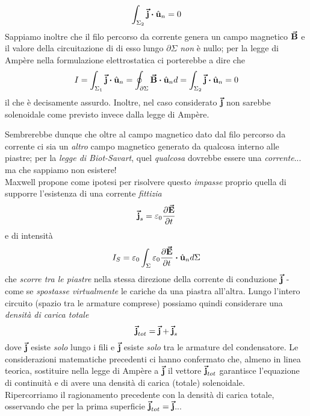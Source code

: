 \begin{equation*}
	\int_{\Sigma_2}\vba{j}\vdot\vbh{u}_n=0
\end{equation*}
Sappiamo inoltre che il filo percorso da corrente genera un campo magnetico $\vb*{\va{B}}$ e il valore della circuitazione di di esso lungo $\partial \Sigma$ \textit{non} è nullo; per la legge di Ampère nella formulazione elettrostatica ci porterebbe a dire che
\begin{equation*}
	I=\int_{\Sigma_1}\vba{j}\vdot\vbh{u}_n=\oint_{\partial \Sigma}\vba{B}\vdot\vbh{u}_nd=\int_{\Sigma_2}\vba{j}\vdot\vbh{u}_n=0
\end{equation*} 
il che è decisamente assurdo. Inoltre, nel caso considerato $\vb*{\va{j}}$ non sarebbe solenoidale come previsto invece dalla legge di Ampère.

Sembrerebbe dunque che oltre al campo magnetico dato dal filo percorso da corrente ci sia un \textit{altro} campo magnetico generato da qualcosa interno alle piastre; per la \textit{legge di Biot-Savart}, quel \textit{qualcosa} dovrebbe essere una \textit{corrente}... ma che sappiamo non esistere!\\
Maxwell propone come ipotesi per risolvere questo \textit{impasse} proprio quella di supporre l'esistenza di una corrente \textit{fittizia}
\begin{equation*}
	\vb*{\va{j}}_s=\varepsilon_0\pdv{\vb*{\va{E}}}{t}
\end{equation*}
e di intensità
\begin{equation*}
	I_S=\epsilon_0\int_{\Sigma}\epsilon_0\pdv{\vba{E}}{t}\vdot \vbh{u}_nd\Sigma
\end{equation*}
che \textit{scorre tra le piastre} nella stessa direzione della corrente di conduzione $\vb*{\va{j}}$ - come se \textit{spostasse virtualmente} le cariche da una piastra all'altra.
Lungo l'intero circuito (spazio tra le armature comprese) possiamo quindi considerare una \textit{densità di carica totale}
\begin{equation*}
	\vb*{\va{j}}_{tot}=\vb*{\va{j}}+\vb*{\va{j}}_s
\end{equation*}
dove $\vb*{\va{j}}$ esiste \textit{solo} lungo i fili e $\vb*{\va{j}}$ esiste \textit{solo} tra le armature del condensatore. Le considerazioni matematiche precedenti ci hanno confermato che, almeno in linea teorica, sostituire nella legge di Ampère a $\vb*{\va{j}}$ il vettore $\vb*{\va{j}}_{tot}$ garantisce l'equazione di continuità e di avere una densità di carica (totale) solenoidale.\\
Ripercorriamo il ragionamento precedente con la densità di carica totale, osservando che per la prima superficie $\vb*{\va{j}}_{tot}=\vb*{\va{j}}$...
